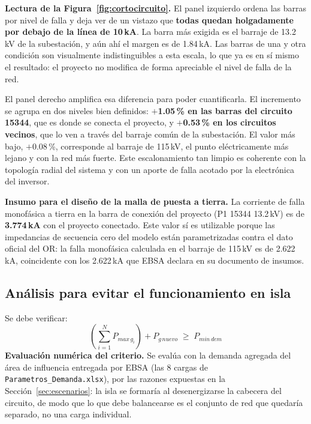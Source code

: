 \documentclass[11pt,a4paper]{article}
\begin{document}
\textbf{Lectura de la Figura~\ref{fig:cortocircuito}.} El panel izquierdo ordena las barras por nivel de falla y deja ver de un vistazo que \textbf{todas quedan holgadamente por debajo de la l\'inea de 10\,kA}. La barra m\'as exigida es el barraje de 13.2\,kV de la subestaci\'on, y a\'un ah\'i el margen es de 1.84\,kA. Las barras de una y otra condici\'on son visualmente indistinguibles a esta escala, lo que ya es en s\'i mismo el resultado: el proyecto no modifica de forma apreciable el nivel de falla de la red.

El panel derecho amplifica esa diferencia para poder cuantificarla. El incremento se agrupa en dos niveles bien definidos: \textbf{$+$1.05\,\% en las barras del circuito 15344}, que es donde se conecta el proyecto, y \textbf{$+$0.53\,\% en los circuitos vecinos}, que lo ven a trav\'es del barraje com\'un de la subestaci\'on. El valor m\'as bajo, $+$0.08\,\%, corresponde al barraje de 115\,kV, el punto el\'ectricamente m\'as lejano y con la red m\'as fuerte. Este escalonamiento tan limpio es coherente con la topolog\'ia radial del sistema y con un aporte de falla acotado por la electr\'onica del inversor.

\textbf{Insumo para el dise\~no de la malla de puesta a tierra.} La corriente de
falla monof\'asica a tierra en la barra de conexi\'on del proyecto (P1 15344
13.2\,kV) es de \textbf{3.774\,kA} con el proyecto conectado. Este valor s\'i es
utilizable porque las impedancias de secuencia cero del modelo est\'an
parametrizadas contra el dato oficial del OR: la falla monof\'asica calculada en el
barraje de 115\,kV es de 2.622\,kA, coincidente con los 2.622\,kA que EBSA declara
en su documento de insumos.

\subsection{An\'alisis para evitar el funcionamiento en isla}
\label{sec:isla}
Se debe verificar:
\[
\left(\sum_{i=1}^{N} P_{max\,g_i}\right) + P_{g\,nuevo} \; \geq \; P_{min\,dem}
\]
\textbf{Evaluaci\'on num\'erica del criterio.} Se eval\'ua con la demanda agregada del \'area de influencia entregada por EBSA (las 8 cargas de \texttt{Parametros\_Demanda.xlsx}), por las razones expuestas en la Secci\'on~\ref{sec:escenarios}: la isla se formar\'ia al desenergizarse la cabecera del circuito, de modo que lo que debe balancearse es el conjunto de red que quedar\'ia separado, no una carga individual.
\end{document}

